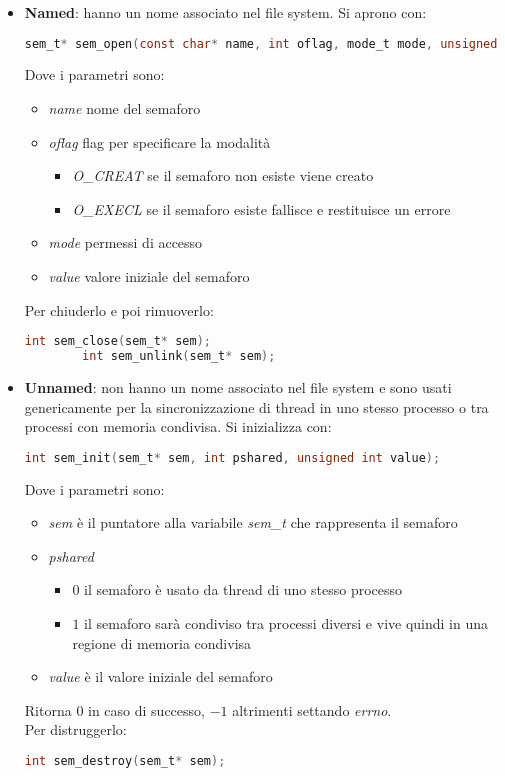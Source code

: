 \begin{itemize}
	\item \textbf{Named}: hanno un nome associato nel file system. Si aprono con:
	\begin{lstlisting}[language=C]
		sem_t* sem_open(const char* name, int oflag, mode_t mode, unsigned int value);
	\end{lstlisting}
	Dove i parametri sono:
	\begin{itemize}
		\item \textit{name} nome del semaforo
		\item \textit{oflag} flag per specificare la modalità
		\begin{itemize}
			\item \textit{O\_CREAT} se il semaforo non esiste viene creato
			\item \textit{O\_EXECL} se il semaforo esiste fallisce e restituisce un errore
		\end{itemize}
		\item \textit{mode} permessi di accesso
		\item \textit{value} valore iniziale del semaforo
	\end{itemize}
	Per chiuderlo e poi rimuoverlo:
	\begin{lstlisting}[language=C]
		int sem_close(sem_t* sem);
		int sem_unlink(sem_t* sem);
	\end{lstlisting}
	\item \textbf{Unnamed}: non hanno un nome associato nel file system e sono usati genericamente per la sincronizzazione di thread in uno stesso processo o tra processi con memoria condivisa. Si inizializza con:
	\begin{lstlisting}[language=C]
		int sem_init(sem_t* sem, int pshared, unsigned int value);
	\end{lstlisting}
	Dove i parametri sono:
	\begin{itemize}
		\item \textit{sem} è il puntatore alla variabile \textit{sem\_t} che rappresenta il semaforo
		\item \textit{pshared}
		\begin{itemize}
			\item $0$ il semaforo è usato da thread di uno stesso processo
			\item $1$ il semaforo sarà condiviso tra processi diversi e vive quindi in una regione di memoria condivisa
		\end{itemize}
		\item \textit{value} è il valore iniziale del semaforo
	\end{itemize}
	Ritorna $0$ in caso di successo, $-1$ altrimenti settando \textit{errno}.\\
	Per distruggerlo:
	\begin{lstlisting}[language=C]
		int sem_destroy(sem_t* sem);
	\end{lstlisting}
\end{itemize}

